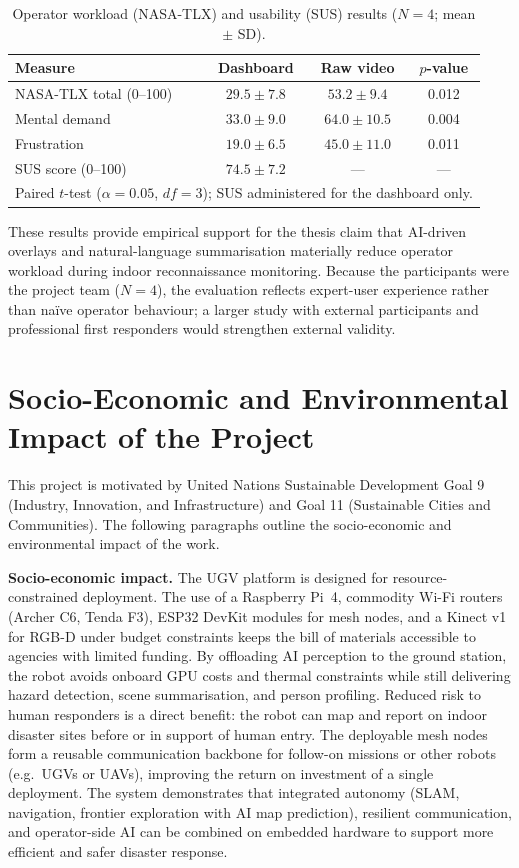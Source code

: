 \begin{table}[htbp]
\caption{Operator workload (NASA-TLX) and usability (SUS) results ($N=4$; mean $\pm$ SD).}
\label{tab:userstudy}
\centering
\begin{tabular}{lccc}
\toprule
\textbf{Measure} & \textbf{Dashboard} & \textbf{Raw video} & \textbf{$p$-value} \\
\midrule
NASA-TLX total (0--100) & $29.5 \pm 7.8$ & $53.2 \pm 9.4$ & 0.012 \\
\quad Mental demand & $33.0 \pm 9.0$ & $64.0 \pm 10.5$ & 0.004 \\
\quad Frustration & $19.0 \pm 6.5$ & $45.0 \pm 11.0$ & 0.011 \\
\midrule
SUS score (0--100) & $74.5 \pm 7.2$ & --- & --- \\
\bottomrule
\multicolumn{4}{l}{\footnotesize Paired $t$-test ($\alpha = 0.05$, $df = 3$); SUS administered for the dashboard only.}
\end{tabular}
\end{table}

These results provide empirical support for the thesis claim that AI-driven overlays and natural-language summarisation materially reduce operator workload during indoor reconnaissance monitoring. Because the participants were the project team ($N=4$), the evaluation reflects expert-user experience rather than na\"ive operator behaviour; a larger study with external participants and professional first responders would strengthen external validity.

\section{Socio-Economic and Environmental Impact of the Project}

This project is motivated by United Nations Sustainable Development Goal 9 (Industry, Innovation, and Infrastructure) and Goal 11 (Sustainable Cities and Communities). The following paragraphs outline the socio-economic and environmental impact of the work.

\textbf{Socio-economic impact.} The UGV platform is designed for resource-constrained deployment. The use of a Raspberry Pi~4, commodity Wi-Fi routers (Archer C6, Tenda F3), ESP32 DevKit modules for mesh nodes, and a Kinect v1 for RGB-D under budget constraints keeps the bill of materials accessible to agencies with limited funding. By offloading AI perception to the ground station, the robot avoids onboard GPU costs and thermal constraints while still delivering hazard detection, scene summarisation, and person profiling. Reduced risk to human responders is a direct benefit: the robot can map and report on indoor disaster sites before or in support of human entry. The deployable mesh nodes form a reusable communication backbone for follow-on missions or other robots (e.g.\ UGVs or UAVs), improving the return on investment of a single deployment. The system demonstrates that integrated autonomy (SLAM, navigation, frontier exploration with AI map prediction), resilient communication, and operator-side AI can be combined on embedded hardware to support more efficient and safer disaster response.

